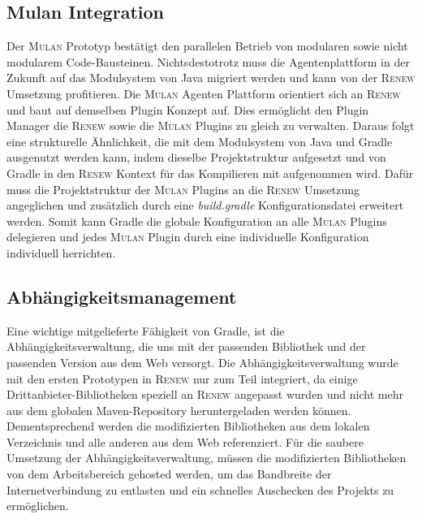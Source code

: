  \subsection*{Mulan Integration}
	Der \textsc{Mulan} Prototyp bestätigt den parallelen Betrieb von modularen sowie nicht modularem Code-Bausteinen. Nichtsdestotrotz muss die Agentenplattform in der Zukunft auf das Modulsystem von Java migriert werden und kann von der \textsc{Renew} Umsetzung profitieren.\newline 
	Die \textsc{Mulan} Agenten Plattform orientiert sich an \textsc{Renew} und baut auf demselben Plugin Konzept auf. Dies ermöglicht den Plugin Manager die \textsc{Renew} sowie die \textsc{Mulan} Plugins zu gleich zu verwalten. Daraus folgt eine strukturelle Ähnlichkeit, die mit dem Modulsystem von Java und Gradle ausgenutzt werden kann, indem dieselbe Projektstruktur aufgesetzt und von Gradle in den \textsc{Renew} Kontext für das Kompilieren mit aufgenommen wird.\newline
	Dafür muss die Projektstruktur der \textsc{Mulan} Plugins an die \textsc{Renew} Umsetzung angeglichen und zusätzlich durch eine \textit{build.gradle} Konfigurationsdatei erweitert werden. Somit kann Gradle die globale Konfiguration an alle \textsc{Mulan} Plugins delegieren und jedes \textsc{Mulan} Plugin durch eine individuelle Konfiguration individuell herrichten. 
		
 \subsection*{Abhängigkeitsmanagement}
	Eine wichtige mitgelieferte Fähigkeit von Gradle, ist die Abhängigkeitsverwaltung, die uns mit der passenden Bibliothek und der passenden Version aus dem Web versorgt. Die Abhängigkeitsverwaltung wurde mit den ersten Prototypen in \textsc{Renew} nur zum Teil integriert, da einige Drittanbieter-Bibliotheken speziell an \textsc{Renew} angepasst wurden und nicht mehr aus dem globalen Maven-Repository heruntergeladen werden können. Dementsprechend werden die modifizierten Bibliotheken aus dem lokalen Verzeichnis und alle anderen aus dem Web referenziert.\newline
	Für die saubere Umsetzung der Abhängigkeitsverwaltung, müssen die modifizierten Bibliotheken von dem Arbeitsbereich gehosted werden, um das Bandbreite der Internetverbindung zu entlasten und ein schnelles Auschecken des Projekts zu ermöglichen. 	
	
